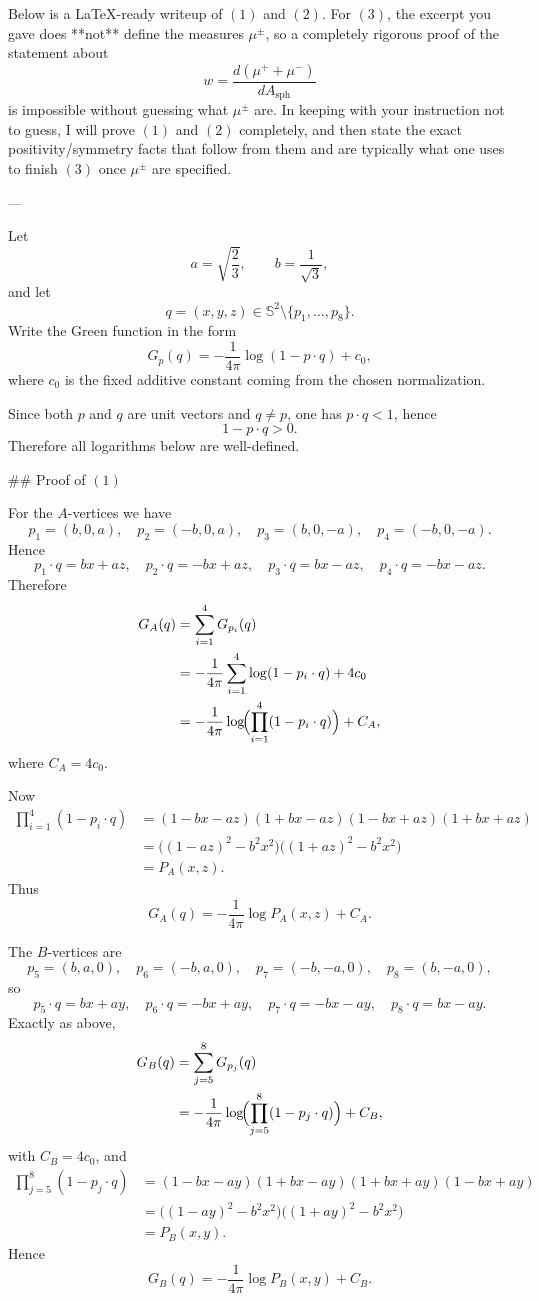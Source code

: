 Below is a LaTeX-ready writeup of \((1)\) and \((2)\).  
For \((3)\), the excerpt you gave does **not** define the measures \(\mu^\pm\), so a completely rigorous proof of the statement about
\[
w=\frac{d(\mu^++\mu^-)}{dA_{\mathrm{sph}}}
\]
is impossible without guessing what \(\mu^\pm\) are. In keeping with your instruction not to guess, I will prove \((1)\) and \((2)\) completely, and then state the exact positivity/symmetry facts that follow from them and are typically what one uses to finish \((3)\) once \(\mu^\pm\) are specified.

---

Let
\[
a=\sqrt{\frac23},\qquad b=\frac1{\sqrt3},
\]
and let
\[
q=(x,y,z)\in \mathbb S^2\setminus\{p_1,\dots,p_8\}.
\]
Write the Green function in the form
\[
G_p(q)=-\frac1{4\pi}\log(1-p\cdot q)+c_0,
\]
where \(c_0\) is the fixed additive constant coming from the chosen normalization.

Since both \(p\) and \(q\) are unit vectors and \(q\neq p\), one has \(p\cdot q<1\), hence
\[
1-p\cdot q>0.
\]
Therefore all logarithms below are well-defined.

## Proof of \((1)\)

For the \(A\)-vertices we have
\[
p_1=(b,0,a),\quad p_2=(-b,0,a),\quad p_3=(b,0,-a),\quad p_4=(-b,0,-a).
\]
Hence
\[
p_1\cdot q=bx+az,\quad
p_2\cdot q=-bx+az,\quad
p_3\cdot q=bx-az,\quad
p_4\cdot q=-bx-az.
\]
Therefore
\[
\begin{aligned}
G_A(q)
&=\sum_{i=1}^4 G_{p_i}(q) \\
&=-\frac1{4\pi}\sum_{i=1}^4 \log(1-p_i\cdot q)+4c_0 \\
&=-\frac1{4\pi}\log\!\Bigl(\prod_{i=1}^4 (1-p_i\cdot q)\Bigr)+C_A,
\end{aligned}
\]
where \(C_A=4c_0\).

Now
\[
\begin{aligned}
\prod_{i=1}^4 (1-p_i\cdot q)
&=(1-bx-az)(1+bx-az)(1-bx+az)(1+bx+az) \\
&=\bigl((1-az)^2-b^2x^2\bigr)\bigl((1+az)^2-b^2x^2\bigr) \\
&=P_A(x,z).
\end{aligned}
\]
Thus
\[
G_A(q)=-\frac1{4\pi}\log P_A(x,z)+C_A.
\]

The \(B\)-vertices are
\[
p_5=(b,a,0),\quad p_6=(-b,a,0),\quad p_7=(-b,-a,0),\quad p_8=(b,-a,0),
\]
so
\[
p_5\cdot q=bx+ay,\quad
p_6\cdot q=-bx+ay,\quad
p_7\cdot q=-bx-ay,\quad
p_8\cdot q=bx-ay.
\]
Exactly as above,
\[
\begin{aligned}
G_B(q)
&=\sum_{j=5}^8 G_{p_j}(q) \\
&=-\frac1{4\pi}\log\!\Bigl(\prod_{j=5}^8 (1-p_j\cdot q)\Bigr)+C_B,
\end{aligned}
\]
with \(C_B=4c_0\), and
\[
\begin{aligned}
\prod_{j=5}^8 (1-p_j\cdot q)
&=(1-bx-ay)(1+bx-ay)(1+bx+ay)(1-bx+ay) \\
&=\bigl((1-ay)^2-b^2x^2\bigr)\bigl((1+ay)^2-b^2x^2\bigr) \\
&=P_B(x,y).
\end{aligned}
\]
Hence
\[
G_B(q)=-\frac1{4\pi}\log P_B(x,y)+C_B.
\]

